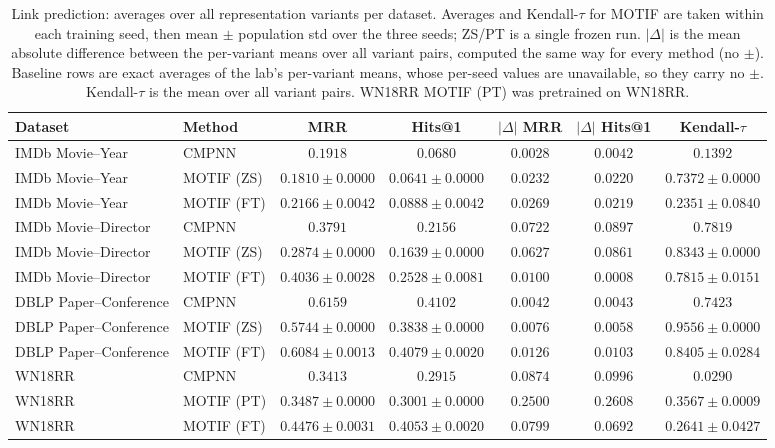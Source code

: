 \documentclass{article}
\begin{document}
\begin{table}[t]
\centering
\small
\begin{tabular}{||l||l||c|c||c|c||c||}
\hline
\textbf{Dataset} & \textbf{Method} & \textbf{MRR} & \textbf{Hits@1} & \textbf{$|\Delta|$ MRR} & \textbf{$|\Delta|$ Hits@1} & \textbf{Kendall-$\tau$} \\
\hline\hline
IMDb Movie--Year & CMPNN & $0.1918$ & $0.0680$ & $0.0028$ & $0.0042$ & $0.1392$ \\
\hline
IMDb Movie--Year & MOTIF (ZS) & $0.1810 \pm 0.0000$ & $0.0641 \pm 0.0000$ & $0.0232$ & $0.0220$ & $0.7372 \pm 0.0000$ \\
\hline
IMDb Movie--Year & MOTIF (FT) & $0.2166 \pm 0.0042$ & $0.0888 \pm 0.0042$ & $0.0269$ & $0.0219$ & $0.2351 \pm 0.0840$ \\
\hline
\hline
IMDb Movie--Director & CMPNN & $0.3791$ & $0.2156$ & $0.0722$ & $0.0897$ & $0.7819$ \\
\hline
IMDb Movie--Director & MOTIF (ZS) & $0.2874 \pm 0.0000$ & $0.1639 \pm 0.0000$ & $0.0627$ & $0.0861$ & $0.8343 \pm 0.0000$ \\
\hline
IMDb Movie--Director & MOTIF (FT) & $0.4036 \pm 0.0028$ & $0.2528 \pm 0.0081$ & $0.0100$ & $0.0008$ & $0.7815 \pm 0.0151$ \\
\hline
\hline
DBLP Paper--Conference & CMPNN & $0.6159$ & $0.4102$ & $0.0042$ & $0.0043$ & $0.7423$ \\
\hline
DBLP Paper--Conference & MOTIF (ZS) & $0.5744 \pm 0.0000$ & $0.3838 \pm 0.0000$ & $0.0076$ & $0.0058$ & $0.9556 \pm 0.0000$ \\
\hline
DBLP Paper--Conference & MOTIF (FT) & $0.6084 \pm 0.0013$ & $0.4079 \pm 0.0020$ & $0.0126$ & $0.0103$ & $0.8405 \pm 0.0284$ \\
\hline
\hline
WN18RR & CMPNN & $0.3413$ & $0.2915$ & $0.0874$ & $0.0996$ & $0.0290$ \\
\hline
WN18RR & MOTIF (PT) & $0.3487 \pm 0.0000$ & $0.3001 \pm 0.0000$ & $0.2500$ & $0.2608$ & $0.3567 \pm 0.0009$ \\
\hline
WN18RR & MOTIF (FT) & $0.4476 \pm 0.0031$ & $0.4053 \pm 0.0020$ & $0.0799$ & $0.0692$ & $0.2641 \pm 0.0427$ \\
\hline
\end{tabular}
\caption{Link prediction: averages over all representation variants per dataset. Averages and Kendall-$\tau$ for MOTIF are taken within each training seed, then mean $\pm$ population std over the three seeds; ZS/PT is a single frozen run. $|\Delta|$ is the mean absolute difference between the per-variant means over all variant pairs, computed the same way for every method (no $\pm$). Baseline rows are exact averages of the lab's per-variant means, whose per-seed values are unavailable, so they carry no $\pm$. Kendall-$\tau$ is the mean over all variant pairs. WN18RR MOTIF (PT) was pretrained on WN18RR.}
\label{tab:overview_lp}
\end{table}
\end{document}
